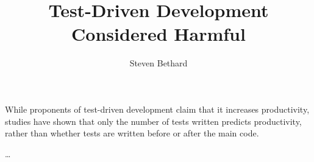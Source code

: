 \documentclass[12pt]{article}
\title{Test-Driven Development Considered Harmful}
\author{Steven Bethard}
\begin{document}
\maketitle

While proponents of test-driven development claim that it increases productivity, studies have shown that only the number of tests written predicts productivity, rather than whether tests are written before or after the main code.

\ldots

\end{document}
